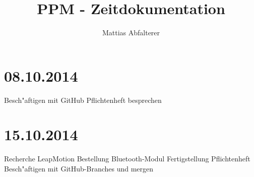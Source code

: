 \documentclass[11pt,a4paper]{article}
\begin{document}
\title{PPM - Zeitdokumentation}
\author{Mattias Abfalterer}
\maketitle

\vfill
\pagebreak

\chapter{08.10.2014}

Besch"aftigen mit GitHub
Pflichtenheft besprechen



\chapter{15.10.2014}


Recherche LeapMotion
Bestellung Bluetooth-Modul
Fertigstellung Pflichtenheft
Besch"aftigen mit GitHub-Branches und mergen
\end{document}
